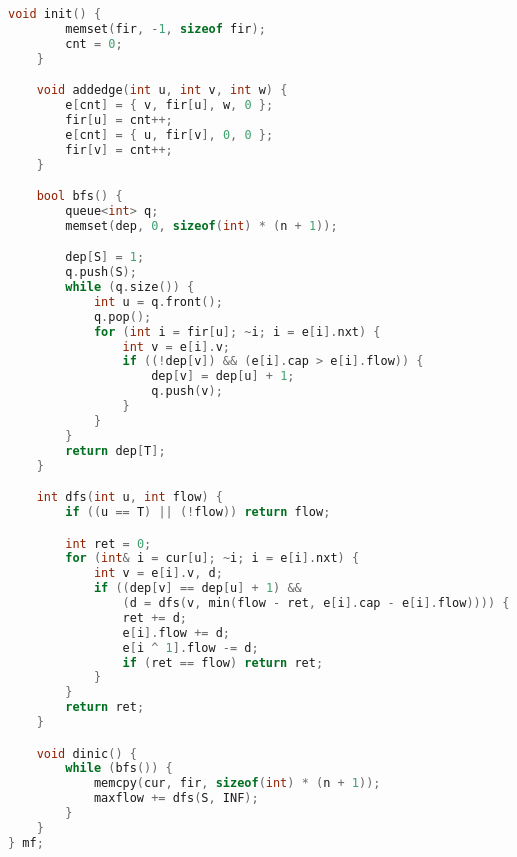 \begin{lstlisting}[language = c++]
    void init() {
        memset(fir, -1, sizeof fir);
        cnt = 0;
    }

    void addedge(int u, int v, int w) {
        e[cnt] = { v, fir[u], w, 0 };
        fir[u] = cnt++;
        e[cnt] = { u, fir[v], 0, 0 };
        fir[v] = cnt++;
    }

    bool bfs() {
        queue<int> q;
        memset(dep, 0, sizeof(int) * (n + 1));

        dep[S] = 1;
        q.push(S);
        while (q.size()) {
            int u = q.front();
            q.pop();
            for (int i = fir[u]; ~i; i = e[i].nxt) {
                int v = e[i].v;
                if ((!dep[v]) && (e[i].cap > e[i].flow)) {
                    dep[v] = dep[u] + 1;
                    q.push(v);
                }
            }
        }
        return dep[T];
    }

    int dfs(int u, int flow) {
        if ((u == T) || (!flow)) return flow;

        int ret = 0;
        for (int& i = cur[u]; ~i; i = e[i].nxt) {
            int v = e[i].v, d;
            if ((dep[v] == dep[u] + 1) &&
                (d = dfs(v, min(flow - ret, e[i].cap - e[i].flow)))) {
                ret += d;
                e[i].flow += d;
                e[i ^ 1].flow -= d;
                if (ret == flow) return ret;
            }
        }
        return ret;
    }

    void dinic() {
        while (bfs()) {
            memcpy(cur, fir, sizeof(int) * (n + 1));
            maxflow += dfs(S, INF);
        }
    }
} mf;
\end{lstlisting}